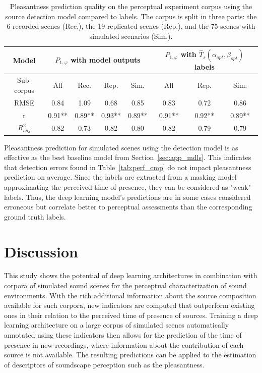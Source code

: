 \documentclass[twocolumn]{article}
\begin{document}
\begin{table}[t]
\centering
\caption{Pleasantness prediction quality on the perceptual experiment corpus using the source detection model compared to labels. The corpus is split in three parts: the 6 recorded scenes (Rec.), the 19 replicated scenes (Rep.), and the 75 scenes with simulated scenarios (Sim.).}
\label{tab:pppred}
\begin{tabular}{ c | c c c c | c c c }
\hline
	Model & \multicolumn{4}{|c}{$P_{1, \varphi}$ with model outputs} & \multicolumn{3}{|c}{$P_{1, \varphi}$ with $\hat T_s(\alpha_{opt}, \beta_{opt})$ labels} \\ \hline
	Sub-corpus & All & Rec. & Rep. & Sim. & All & Rep. & Sim. \\ \hline
	RMSE & 0.84 & 1.09 & 0.68 & 0.85 & 0.83 & 0.72 & 0.86 \\ \hline
	r & 0.91** & 0.89** & 0.93** & 0.89** & 0.91** & 0.92** & 0.89** \\ \hline
	$R^2_{adj}$ & 0.82 & 0.73 & 0.82 & 0.80 & 0.82 & 0.79 & 0.79 \\ \hline
\end{tabular}
\end{table}

Pleasantness prediction for simulated scenes using the detection model is as effective as the best baseline model from Section~\ref{sec:app_mdls}. This indicates that detection errors found in Table~\ref{tab:perf_cmp} do not impact pleasantness prediction on average. Since the labels are extracted from a masking model approximating the perceived time of presence, they can be considered as "weak" labels. Thus, the deep learning model's predictions are in some cases considered erroneous but correlate better to perceptual assessments than the corresponding ground truth labels.

\section{Discussion}
\label{sec:discussion}

This study shows the potential of deep learning architectures in combination with corpora of simulated sound scenes for the perceptual characterization of sound environments. With the rich additional information about the source composition available for such corpora, new indicators are computed that outperform existing ones in their relation to the perceived time of presence of sources. Training a deep learning architecture on a large corpus of simulated scenes automatically annotated using these indicators then allows for the prediction of the time of presence in new recordings, where information about the contribution of each source is not available. The resulting predictions can be applied to the estimation of descriptors of soundscape perception such as the pleasantness.
\end{document}
